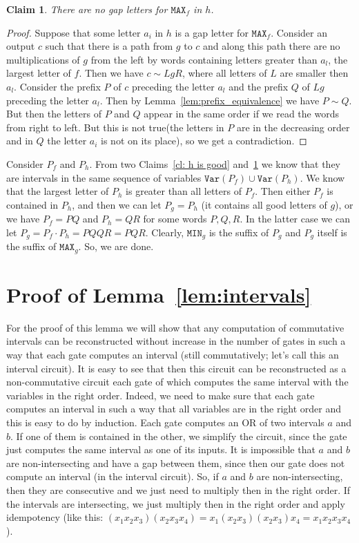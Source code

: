 \documentclass[11pt,letterpaper]{article}
\newtheorem{claim}{Claim}
\newcommand{\mmin}{\texttt{MIN}}
\newcommand{\mmax}{\texttt{MAX}}
\newcommand{\var}{\texttt{Var}}
\begin{document}
\begin{claim}\label{cl: f is good}
There are no gap letters for $\mmax_f$ in $h$.
\end{claim}

\begin{proof}
Suppose that some letter $a_i$ in $h$ is a gap letter for $\mmax_f$. Consider an output $c$ such that there is a path from $g$ to $c$ and along this path there are no multiplications of $g$ from the left by words containing letters greater than $a_l$, the largest letter of $f$. Then we have $c \sim LgR$, where all letters of $L$ are smaller then $a_l$. Consider the prefix $P$ of $c$ preceding the letter $a_l$ and the prefix $Q$ of $Lg$ preceding the letter $a_l$.
Then by Lemma~\ref{lem:prefix_equivalence} we have $P \sim Q$. But then the letters of $P$ and $Q$ appear in the same order if we read the words from right to left. But this is not true(the letters in $P$ are in the decreasing order and in $Q$ the letter $a_i$ is not on its place), so we get a contradiction.
\end{proof}

Consider $P_f$ and $P_h$. From two Claims~\ref{cl: h is good} and~\ref{cl: f is good} we know that they are intervals in the same sequence of variables $\var(P_f)\cup \var(P_h)$. We know that the largest letter of $P_h$ is greater than all letters of $P_f$. Then either $P_f$ is contained in $P_h$, and then we can let $P_g=P_h$ (it contains all good letters of $g$), or we have $P_f =PQ$ and $P_h=QR$ for some words $P, Q, R$. In the latter case we can let $P_g = P_f \cdot P_h = PQQR=PQR$. Clearly, $\mmin_g$ is the suffix of $P_g$ and $P_g$ itself is the suffix of $\mmax_g$. So, we are done.




\section{Proof of Lemma~\ref{lem:intervals}}

For the proof of this lemma we will show that any computation of commutative intervals can be reconstructed without increase in the number of gates in such a way that each gate computes an interval (still commutatively; let's call this an interval circuit). It is easy to see that then this circuit can be reconstructed as a non-commutative circuit each gate of which computes the same interval with the variables in the right order. Indeed, we need to make sure that each gate computes an interval in such a way that all variables are in the right order and this is easy to do by induction. Each gate computes an OR of two intervals $a$ and $b$. If one of them is contained in the other, we simplify the circuit, since the gate just computes the same interval as one of its inputs. It is impossible that $a$ and $b$ are non-intersecting and have a gap between them, since then our gate does not compute an interval (in the interval circuit). So, if $a$ and  $b$ are non-intersecting, then they are consecutive and we just need to multiply then in the right order. If the intervals are intersecting, we just multiply then in the right order and apply idempotency (like this: $(x_1x_2x_3)(x_2x_3x_4)=x_1(x_2x_3)(x_2x_3)x_4=x_1x_2x_3x_4$).
\end{document}
